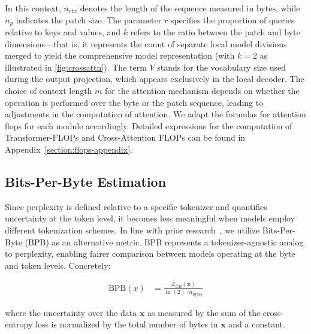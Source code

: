 In this context, $n_{ctx}$ denotes the length of the sequence measured in bytes, while $n_p$ indicates the patch size. The parameter $r$ specifies the proportion of queries relative to keys and values, and $k$ refers to the ratio between the patch and byte dimensions—that is, it represents the count of separate local model divisions merged to yield the comprehensive model representation (with $k=2$ as illustrated in \autoref{fig:crossattn}). The term $V$ stands for the vocabulary size used during the output projection, which appears exclusively in the local decoder. The choice of context length $m$ for the attention mechanism depends on whether the operation is performed over the byte or the patch sequence, leading to adjustments in the computation of attention. We adapt the formulas for attention flops for each module accordingly. Detailed expressions for the computation of Transformer-FLOPs and Cross-Attention FLOPs can be found in Appendix~\ref{section:flops-appendix}.

\subsection{Bits-Per-Byte Estimation} Since perplexity is defined relative to a specific tokenizer and quantifies uncertainty at the token level, it becomes less meaningful when models employ different tokenization schemes. In line with prior research~\citep{xue2022byt5, yu2023megabyte, wang2024mambabyte}, we utilize Bits-Per-Byte (BPB) as an alternative metric. BPB represents a tokenizer-agnostic analog to perplexity, enabling fairer comparison between models operating at the byte and token levels. Concretely:

\begin{align}
    \text{BPB}(x)&= \frac{\mathcal{L}_{CE}(\pmb{x})}{\ln(2)\cdot n_{\text{bytes}}}
\end{align}

where the uncertainty over the data $\pmb{x}$ as measured by the sum of the cross-entropy loss is normalized by the total number of bytes in $\pmb{x}$ and a constant. 

